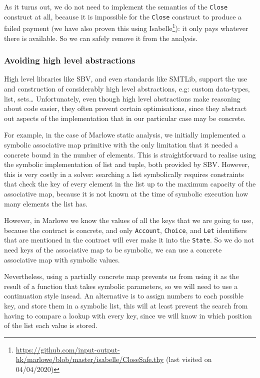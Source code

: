 \documentclass[english,runningheads]{llncs}
\begin{document}
As it turns out, we do not need to implement the semantics of the
\texttt{Close} construct at all, because it is impossible for the
\texttt{Close} construct to produce a failed payment
(we have also proven this using Isabelle\footnote{\url{https://github.com/input-output-hk/marlowe/blob/master/isabelle/CloseSafe.thy}
(last visited on 04/04/2020)}): it only pays whatever there is available.
So we can safely remove it from the analysis.

\subsubsection{Avoiding high level abstractions }

High level libraries like SBV, and even standards like SMTLib, support
the use and construction of considerably high level abstractions,
e.g: custom data-types, list, sets\dots{} Unfortunately, even though
high level abstractions make reasoning about code easier, they often
prevent certain optimisations, since they abstract out aspects of
the implementation that in our particular case may be concrete.

For example, in the case of Marlowe static analysis, we initially
implemented a symbolic associative map primitive with the only limitation
that it needed a concrete bound in the number of elements. This is
straightforward to realise using the symbolic implementation of list
and tuple, both provided by SBV. However, this is very costly in a
solver: searching a list symbolically requires constraints that check
the key of every element in the list up to the maximum capacity of
the associative map, because it is not known at the time of symbolic
execution how many elements the list has.

However, in Marlowe we know the values of all the keys that we are
going to use, because the contract is concrete, and only \texttt{Account},
\texttt{Choice}, and \texttt{Let} identifiers that are mentioned in
the contract will ever make it into the \texttt{State}. So we do not
need keys of the associative map to be symbolic, we can use a concrete
associative map with symbolic values.

Nevertheless, using a partially concrete map prevents us from using
it as the result of a function that takes symbolic parameters, so
we will need to use a continuation style insead. An alternative is
to assign numbers to each possible key, and store them in a symbolic
list, this will at least prevent the search from having to compare
a lookup with every key, since we will know in which position of the
list each value is stored. 
\end{document}
